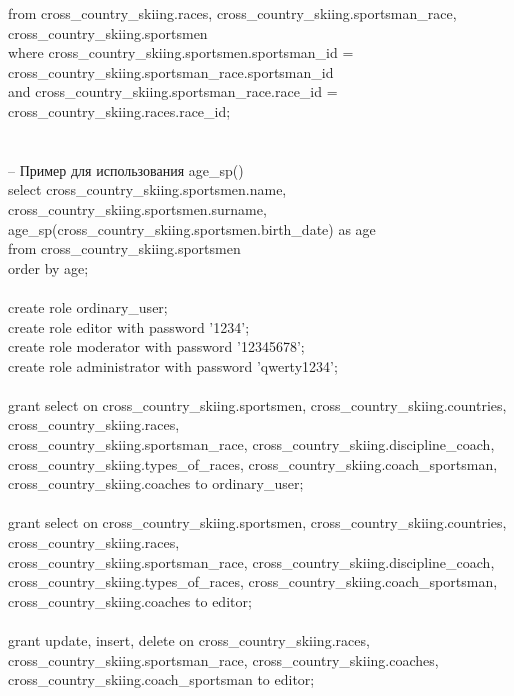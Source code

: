 \documentclass[a4paper,12pt]{article}
\begin{document}
\indent from cross\_country\_skiing.races, cross\_country\_skiing.sportsman\_race, cross\_country\_skiing.sportsmen\\
\indent where cross\_country\_skiing.sportsmen.sportsman\_id = cross\_country\_skiing.sportsman\_race.sportsman\_id \\
\indent and cross\_country\_skiing.sportsman\_race.race\_id = cross\_country\_skiing.races.race\_id;\\
\\
\\
-- Пример для использования age\_sp()\\
select cross\_country\_skiing.sportsmen.name, cross\_country\_skiing.sportsmen.surname, age\_sp(cross\_country\_skiing.sportsmen.birth\_date) as age\\
\indent from cross\_country\_skiing.sportsmen\\
\indent order by age;\\
\\
create role ordinary\_user;\\
create role editor with password '1234';\\
create role moderator with password '12345678';\\
create role administrator with password 'qwerty1234';\\
\\
grant select on cross\_country\_skiing.sportsmen, cross\_country\_skiing.countries, cross\_country\_skiing.races,\\
\indent cross\_country\_skiing.sportsman\_race, cross\_country\_skiing.discipline\_coach,\\
\indent cross\_country\_skiing.types\_of\_races, cross\_country\_skiing.coach\_sportsman, cross\_country\_skiing.coaches to ordinary\_user;\\
\\
grant select on cross\_country\_skiing.sportsmen, cross\_country\_skiing.countries, cross\_country\_skiing.races,\\
\indent cross\_country\_skiing.sportsman\_race, cross\_country\_skiing.discipline\_coach,\\
\indent cross\_country\_skiing.types\_of\_races, cross\_country\_skiing.coach\_sportsman, cross\_country\_skiing.coaches to editor;\\
\\
grant update, insert, delete on cross\_country\_skiing.races, cross\_country\_skiing.sportsman\_race, 
\indent cross\_country\_skiing.coaches, cross\_country\_skiing.coach\_sportsman to editor;\\
\end{document}
